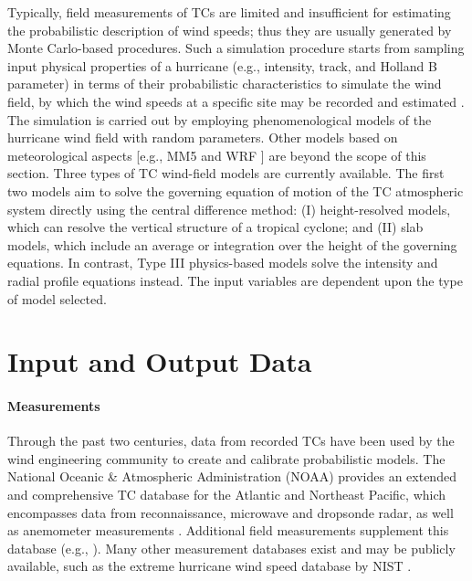 Typically, field measurements of TCs are limited and insufficient for estimating the probabilistic description of wind speeds; thus they are usually generated by Monte Carlo-based procedures. Such a simulation procedure starts from sampling input physical properties of a hurricane (e.g., intensity, track, and Holland B parameter) in terms of their probabilistic characteristics to simulate the wind field, by which the wind speeds at a specific site may be recorded and estimated \citep{russell1971probability}. The simulation is carried out by employing phenomenological models of the hurricane wind field with random parameters. Other models based on meteorological aspects [e.g., MM5 \citep{liu1997multiscale} and WRF \citep{davis2008prediction}] are beyond the scope of this section. Three types of TC wind-field models are currently available. The first two models aim to solve the governing equation of motion of the TC atmospheric system directly using the central difference method: (I) height-resolved models, which can resolve the vertical structure of a tropical cyclone; and (II) slab models, which include an average or integration over the height of the governing equations. In contrast, Type III physics-based models solve the intensity and radial profile equations instead. The input variables are dependent upon the type of model selected.

\section{Input and Output Data}
\label{sec:storm_wind_io}

\paragraph{Measurements} Through the past two centuries, data from recorded TCs have been used by the wind engineering community to create and calibrate probabilistic models. The National Oceanic \& Atmospheric Administration (NOAA) provides an extended and comprehensive TC database for the Atlantic and Northeast Pacific, which encompasses data from reconnaissance, microwave and dropsonde radar, as well as anemometer measurements \citep{data2018}. Additional field measurements supplement this database (e.g., \cite{li2015comparative, wang2016measurements}). Many other measurement databases exist and may be publicly available, such as the extreme hurricane wind speed database by NIST \citep{batts1980hurricane}.

